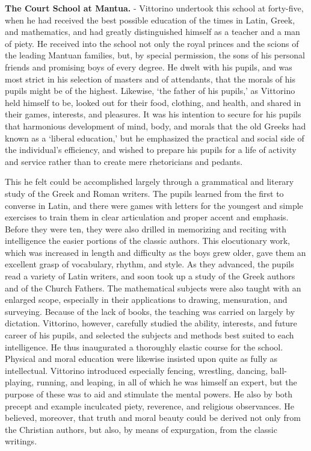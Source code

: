 \documentclass[]{book}
\begin{document}
\textbf{The Court School at Mantua.} - Vittorino undertook this school at forty-five, when he had received the best possible education of the times in Latin, Greek, and mathematics, and had greatly distinguished himself as a teacher and a man of piety. He received into the school not only the royal princes and the scions of the leading Mantuan families, but, by special permission, the sons of his personal friends and promising boys of every degree. He dwelt with his pupils, and was most strict in his selection of masters and of attendants, that the morals of his pupils might be of the highest. Likewise, `the father of his pupils,' as Vittorino held himself to be, looked out for their food, clothing, and health, and shared in their games, interests, and pleasures. It was his intention to secure for his pupils that harmonious development of mind, body, and morals that the old Greeks had known as a `liberal education,' but he emphasized the practical and social side of the individual's efficiency, and wished to prepare his pupils for a life of activity and service rather than to create mere rhetoricians and pedants.

This he felt could be accomplished largely through a grammatical and literary study of the Greek and Roman writers. The pupils learned from the first to converse in Latin, and there were games with letters for the youngest and simple exercises to train them in clear articulation and proper accent and emphasis. Before they were ten, they were also drilled in memorizing and reciting with intelligence the easier portions of the classic authors. This elocutionary work, which was increased in length and difficulty as the boys grew older, gave them an excellent grasp of vocabulary, rhythm, and style. As they advanced, the pupils read a variety of Latin writers, and soon took up a study of the Greek authors and of the Church Fathers. The mathematical subjects were also taught with an enlarged scope, especially in their applications to drawing, mensuration, and surveying. Because of the lack of books, the teaching was carried on largely by dictation. Vittorino, however, carefully studied the ability, interests, and future career of his pupils, and selected the subjects and methods best suited to each intelligence. He thus inaugurated a thoroughly elastic course for the school. Physical and moral education were likewise insisted upon quite as fully as intellectual. Vittorino introduced especially fencing, wrestling, dancing, ball-playing, running, and leaping, in all of which he was himself an expert, but the purpose of these was to aid and stimulate the mental powers. He also by both precept and example inculcated piety, reverence, and religious observances. He believed, moreover, that truth and moral beauty could be derived not only from the Christian authors, but also, by means of expurgation, from the classic writings.
\end{document}
